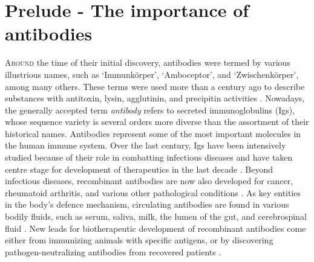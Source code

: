\section{Prelude - The importance of antibodies}
\lettrine[lraise=0.1, nindent=0em, slope=-.5em]{A}{round} the time of their initial discovery, antibodies were termed by various illustrious names, such as ‘Immunkörper’, ‘Amboceptor’, and ‘Zwischenkörper’, among many others. These terms were used more than a century ago to describe substances with antitoxin, lysin, agglutinin, and precipitin activities \cite{london1902der, lindenmann1984origin}. Nowadays, the generally accepted term \emph{antibody} refers to secreted immunoglobulins (Igs), whose sequence variety is several orders more diverse than the assortment of their historical names. Antibodies represent some of the most important molecules in the human immune system. Over the last century, Igs have been intensively studied because of their role in combatting infectious diseases and have taken centre stage for development of therapeutics in the last decade \cite{marks2020how, raybould2020thera-sabdab:, kaplon2021antibodies}. Beyond infectious diseases, recombinant antibodies are now also developed for cancer, rheumatoid arthritis, and various other pathological conditions \cite{singh2018monoclonal}. As key entities in the body’s defence mechanism, circulating antibodies are found in various bodily fluids, such as serum, saliva, milk, the lumen of the gut, and cerebrospinal fluid \cite{schroeder2010structure}. New leads for biotherapeutic development of recombinant antibodies come either from immunizing animals with specific antigens, or by discovering pathogen-neutralizing antibodies from recovered patients \cite{bornholdt2016isolation, corti2016protective, valgardsdottir2021identification}.
